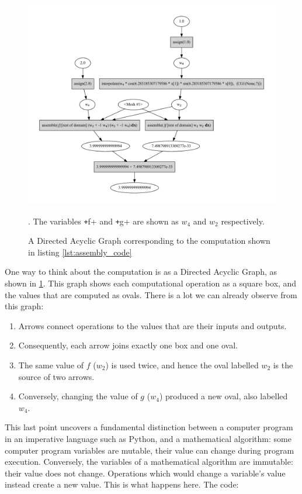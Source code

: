 \documentclass[a4paper,12pt]{report}
\begin{document}
\begin{figure}
    \includegraphics*[width=\textwidth]{examples/assembly.pdf}
    \caption{A Directed Acyclic Graph corresponding to the computation shown in
    listing \ref{lst:assembly_code}}. The variables \texttt+f+ and
    \texttt+g+ are shown as $w_4$ and $w_2$ respectively.
    \label{fig:assembly_dag}
\end{figure}

One way to think about the computation is as a Directed Acyclic Graph, as shown
in \ref{fig:assembly_dag}. This graph shows each computational operation as a
square box, and the values that are computed as ovals. There is a lot we can
already observe from this graph:

\begin{enumerate}
    \item Arrows connect operations to the values that are their inputs and
    outputs.
    \item Consequently, each arrow joins exactly one box and one oval.
    \item The same value of $f$ ($w_2$) is used twice, and hence the oval
    labelled $w_2$ is the source of two arrows.
    \item Conversely, changing the value of $g$ ($w_4$) produced a new oval,
    also labelled $w_4$.
\end{enumerate}

This last point uncovers a fundamental distinction between a computer program
in an imperative language such as Python, and a mathematical algorithm: some
computer program variables are mutable, their value can change during program
execution. Conversely, the variables of a mathematical algorithm are immutable:
their value does not change. Operations which would change a variable's value
instead create a new value. This is what happens here. The code:
\end{document}
